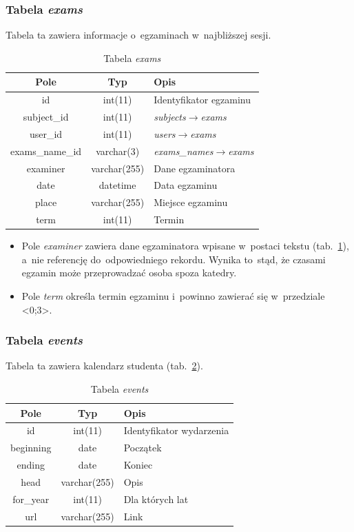\documentclass[a4paper,12pt,oneside]{report}
\begin{document}
\subsubsection{Tabela \emph{exams}}
\label{subsub:exams}
Tabela ta zawiera informacje o~egzaminach w~najbliższej sesji.

\begin{table}[h]
  \centering
  \begin{tabular}{|c|c|l|}\hline
  Pole & Typ & Opis \\\hline
  id   & int(11)   &  Identyfikator egzaminu\\
  subject\_id     & int(11)      & \emph{subjects}$\to$\emph{exams}\\
  user\_id        & int(11)      & \emph{users}$\to$\emph{exams}\\
  exams\_name\_id & varchar(3)   & \emph{exams\_names}$\to$\emph{exams}\\
  examiner        & varchar(255) & Dane egzaminatora \\
  date            & datetime     & Data egzaminu \\
  place           & varchar(255) & Miejsce egzaminu \\
  term            & int(11)      & Termin \\\hline

  \end{tabular}
  \caption{Tabela \emph{exams}\label{tab:exams}}
\end{table}

\begin{itemize}
  \item Pole \emph{examiner} zawiera dane egzaminatora wpisane w~postaci tekstu (tab.~\ref{tab:exams}), a~nie referencję do~odpowiedniego rekordu. Wynika to~stąd, że czasami egzamin może przeprowadzać osoba spoza katedry.
  \item Pole \emph{term} określa termin egzaminu i~powinno zawierać się w~przedziale <0;3>.
\end{itemize}

\newpage
\subsubsection{Tabela \emph{events}}
\label{subsub:events}
Tabela ta zawiera kalendarz studenta (tab.~\ref{tab:events}).

\begin{table}[h]
  \centering
  \begin{tabular}{|c|c|l|}\hline
  Pole & Typ & Opis \\\hline
  id   & int(11)   & Identyfikator wydarzenia\\
  beginning  & date         & Początek \\
  ending     & date         & Koniec \\
  head       & varchar(255) & Opis \\
  for\_year  & int(11)      & Dla których lat \\
  url        & varchar(255) & Link \\\hline
  \end{tabular}
  \caption{Tabela \emph{events}\label{tab:events}}
\end{table}
\end{document}
